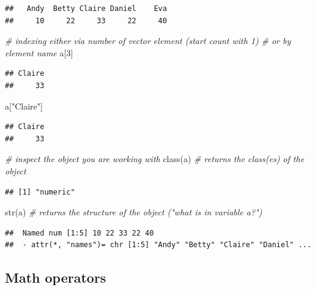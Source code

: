 \documentclass[
  12pt,
]{style/krantz}
\newenvironment{Shaded}{\begin{snugshade}}{\end{snugshade}}
\newcommand{\CommentTok}[1]{\textcolor[rgb]{0.56,0.35,0.01}{\textit{#1}}}
\newcommand{\DecValTok}[1]{\textcolor[rgb]{0.00,0.00,0.81}{#1}}
\newcommand{\FunctionTok}[1]{\textcolor[rgb]{0.00,0.00,0.00}{#1}}
\newcommand{\NormalTok}[1]{#1}
\newcommand{\StringTok}[1]{\textcolor[rgb]{0.31,0.60,0.02}{#1}}
\begin{document}
\begin{verbatim}
##   Andy  Betty Claire Daniel    Eva 
##     10     22     33     22     40
\end{verbatim}

\begin{Shaded}
\begin{Highlighting}[]
\CommentTok{\# indexing either via number of vector element (start count with 1)}
\CommentTok{\# or by element name}
\NormalTok{a[}\DecValTok{3}\NormalTok{]}
\end{Highlighting}
\end{Shaded}

\begin{verbatim}
## Claire 
##     33
\end{verbatim}

\begin{Shaded}
\begin{Highlighting}[]
\NormalTok{a[}\StringTok{"Claire"}\NormalTok{]}
\end{Highlighting}
\end{Shaded}

\begin{verbatim}
## Claire 
##     33
\end{verbatim}

\begin{Shaded}
\begin{Highlighting}[]
\CommentTok{\# inspect the object you are working with}
\FunctionTok{class}\NormalTok{(a) }\CommentTok{\# returns the class(es) of the object}
\end{Highlighting}
\end{Shaded}

\begin{verbatim}
## [1] "numeric"
\end{verbatim}

\begin{Shaded}
\begin{Highlighting}[]
\FunctionTok{str}\NormalTok{(a) }\CommentTok{\# returns the structure of the object ("what is in variable a?")}
\end{Highlighting}
\end{Shaded}

\begin{verbatim}
##  Named num [1:5] 10 22 33 22 40
##  - attr(*, "names")= chr [1:5] "Andy" "Betty" "Claire" "Daniel" ...
\end{verbatim}

\hypertarget{math-operators}{%
\subsection{Math operators}\label{math-operators}}
\end{document}
